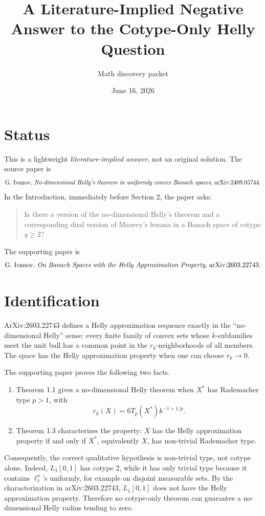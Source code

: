 \documentclass[11pt]{article}
\title{A Literature-Implied Negative Answer to the Cotype-Only Helly Question}
\author{Math discovery packet}
\date{June 16, 2026}
\begin{document}
\maketitle

\section{Status}

This is a lightweight \emph{literature-implied answer}, not an original
solution.  The source paper is
\[
\text{G. Ivanov, \emph{No-dimensional Helly's theorem in uniformly convex
Banach spaces}, arXiv:2409.05744.}
\]
In the Introduction, immediately before Section 2, the paper asks:
\begin{quote}
Is there a version of the no-dimensional Helly's theorem and a corresponding
dual version of Maurey's lemma in a Banach space of cotype \(q\ge 2\)?
\end{quote}

The supporting paper is
\[
\text{G. Ivanov, \emph{On Banach Spaces with the Helly Approximation Property},
arXiv:2603.22743.}
\]

\section{Identification}

ArXiv:2603.22743 defines a Helly approximation sequence exactly in the
``no-dimensional Helly'' sense: every finite family of convex sets whose
\(k\)-subfamilies meet the unit ball has a common point in the
\(r_k\)-neighborhoods of all members.  The space has the Helly approximation
property when one can choose \(r_k\to0\).

The supporting paper proves the following two facts.
\begin{enumerate}[leftmargin=*]
\item Theorem 1.1 gives a no-dimensional Helly theorem when \(X^*\) has
Rademacher type \(p>1\), with
\[
  r_k(X)=6T_p(X^*)k^{-1+1/p}.
\]
\item Theorem 1.3 characterizes the property: \(X\) has the Helly
approximation property if and only if \(X^*\), equivalently \(X\), has
non-trivial Rademacher type.
\end{enumerate}

Consequently, the correct qualitative hypothesis is non-trivial type, not
cotype alone.  Indeed, \(L_1[0,1]\) has cotype \(2\), while it has only
trivial type because it contains \(\ell_1^n\)'s uniformly, for example on
disjoint measurable sets.  By the characterization in arXiv:2603.22743,
\(L_1[0,1]\) does not have the Helly approximation property.  Therefore no
cotype-only theorem can guarantee a no-dimensional Helly radius tending to
zero.
\end{document}
